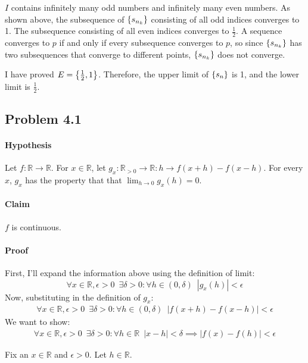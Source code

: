 \documentclass[11pt,letterpaper]{article}
\begin{document}
\begin{Problem}{3.4}
\begin{Proof}
\begin{Case}{3}{$I$ contains infinitely many odd numbers and infinitely many even numbers.}
    As shown above, the subsequence of $\left\{ s_{n_k} \right\}$ consisting of all odd indices converges to 1. The subsequence consisting of all even indices converges to $\frac{1}{2}$. A sequence converges to $p$ if and only if every subsequence converges to $p$, so since $\left\{ s_{n_k} \right\}$ has two subsequences that converge to different points, $\left\{ s_{n_k} \right\}$ does not converge.
\end{Case}
I have proved $E=\left\{ \frac{1}{2},1 \right\}$. Therefore, the upper limit of $\left\{ s_n \right\}$ is 1, and the lower limit is $\frac{1}{2}$.
\end{Proof}
\end{Problem}

\subsection*{Problem 4.1}
\paragraph{Hypothesis}
Let $f : \mathbb{R} \rightarrow \mathbb{R}$. For $x \in \mathbb{R}$, let $g_x : \mathbb{R}_{>0} \rightarrow \mathbb{R} : h \rightarrow f(x+h)-f(x-h)$. For every $x$, $g_x$ has the property that that $\lim_{h \rightarrow 0}g_x(h) = 0$.

\paragraph{Claim} $f$ is continuous. 

\paragraph{Proof} First, I'll expand the information above using the definition of limit:
\[ \forall x\in\mathbb{R},\epsilon>0 \,\,\, \exists\delta>0 : \forall h \in (0, \delta) \,\,\, |g_x(h)|<\epsilon \]
Now, substituting in the definition of $g_x$:
\begin{align}\label{4.1.1} \forall x\in\mathbb{R},\epsilon>0 \,\,\, \exists\delta>0 : \forall h \in (0, \delta) \,\,\, |f(x+h)-f(x-h)|<\epsilon \end{align}
We want to show:
\begin{align}\label{4.1.2} \forall x\in\mathbb{R},\epsilon>0 \,\,\, \exists\delta>0 : \forall h \in\mathbb{R} \,\,\, |x-h|<\delta \implies |f(x)-f(h)|<\epsilon \end{align}

Fix an $x\in\mathbb{R}$ and $\epsilon>0$. Let $h \in \mathbb{R}$.
\end{document}
